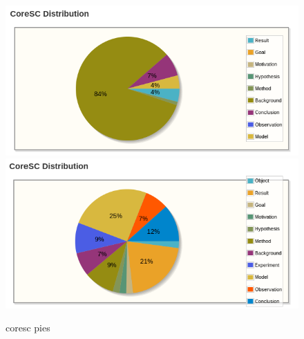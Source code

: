 \documentclass{svmult}
\begin{document}
\begin{figure}[t]
\sidecaption[t]
%
%
\centering
\includegraphics[width=\textwidth]{figures/review_corescs.png}
\includegraphics[width=\textwidth]{figures/report_corescs.png}
\caption{coresc pies}
\label{fig:coresc_pies} 
\end{figure}
\end{document}
